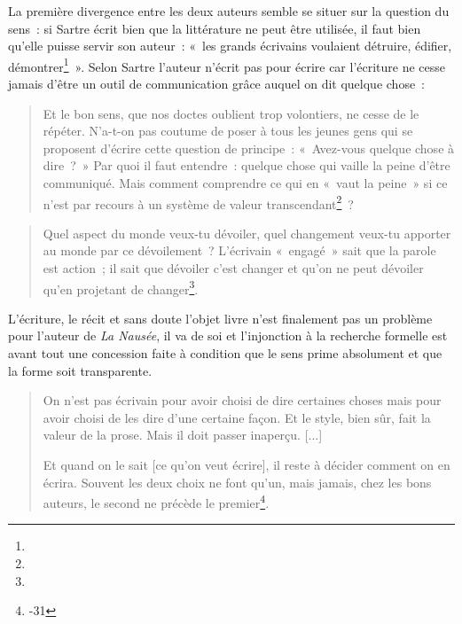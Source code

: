 La première divergence entre les deux auteurs semble se situer sur la question du sens~: si Sartre écrit bien que la littérature ne peut être utilisée, il faut bien qu'elle puisse servir son auteur~: «~les grands écrivains voulaient détruire, édifier, démontrer\footnote{}~». Selon Sartre l'auteur n'écrit pas pour écrire car l'écriture ne cesse jamais d'être un outil de communication grâce auquel on dit quelque chose~:
 \begin{quote}
        Et le bon sens, que nos doctes oublient trop volontiers, ne cesse de le répéter. N'a-t-on pas coutume de poser à tous les jeunes gens qui se proposent d'écrire cette question de principe~: «~Avez-vous quelque chose à dire~?~» Par quoi il faut entendre~: quelque chose qui vaille la peine d'être communiqué. Mais comment comprendre ce qui en «~vaut la peine~» si ce n'est par recours à un système de valeur transcendant\footnote{}~? 
    \end{quote}
    \begin{quote}
        Quel aspect du monde veux-tu dévoiler, quel changement veux-tu apporter au monde par ce dévoilement~? L'écrivain «~engagé~» sait que la parole est action~; il sait que dévoiler c'est changer et qu'on ne peut dévoiler qu'en projetant de changer\footnote{}.
    \end{quote}

L'écriture, le récit et sans doute l'objet livre n'est finalement pas un problème pour l'auteur de \textit{La Nausée}, il va de soi et l'injonction à la recherche formelle est avant tout une concession faite à condition que le sens prime absolument et que la forme soit transparente.
\begin{quote}
    On n'est pas écrivain pour avoir choisi de dire certaines choses mais pour avoir choisi de les dire d'une certaine façon. Et le style, bien sûr, fait la valeur de la prose. Mais il doit passer inaperçu. [...]

    Et quand on le sait [ce qu'on veut écrire], il reste à décider comment on en écrira. Souvent les deux choix ne font qu'un, mais jamais, chez les bons auteurs, le second ne précède le premier\footnote{-31}.
\end{quote}

   


